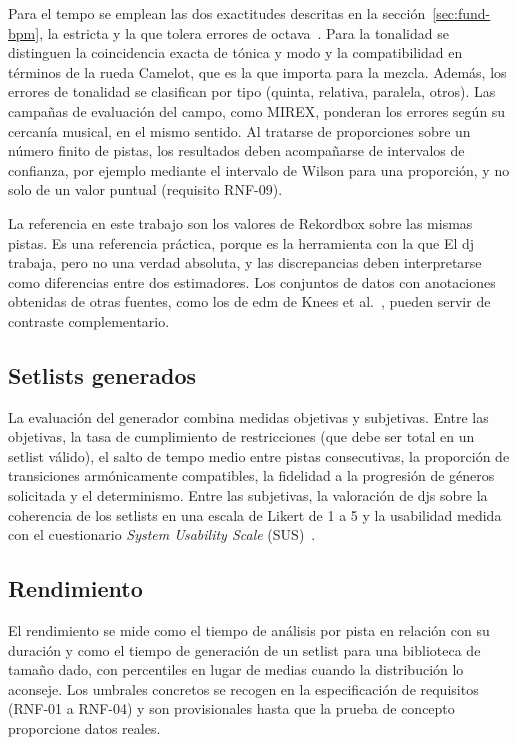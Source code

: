 Para el tempo se emplean las dos exactitudes descritas en la sección~\ref{sec:fund-bpm}, la estricta y la que tolera errores de octava~\cite{gouyon2006experimental}. Para la tonalidad se distinguen la coincidencia exacta de tónica y modo y la compatibilidad en términos de la rueda Camelot, que es la que importa para la mezcla. Además, los errores de tonalidad se clasifican por tipo (quinta, relativa, paralela, otros). Las campañas de evaluación del campo, como MIREX, ponderan los errores según su cercanía musical, en el mismo sentido. Al tratarse de proporciones sobre un número finito de pistas, los resultados deben acompañarse de intervalos de confianza, por ejemplo mediante el intervalo de Wilson para una proporción, y no solo de un valor puntual (requisito RNF-09).

La referencia en este trabajo son los valores de Rekordbox sobre las mismas pistas. Es una referencia práctica, porque es la herramienta con la que El \acs{dj} trabaja, pero no una verdad absoluta, y las discrepancias deben interpretarse como diferencias entre dos estimadores. Los conjuntos de datos con anotaciones obtenidas de otras fuentes, como los de \acs{edm} de Knees et al.~\cite{knees2015giantsteps}, pueden servir de contraste complementario.

\subsection{Setlists generados}

La evaluación del generador combina medidas objetivas y subjetivas. Entre las objetivas, la tasa de cumplimiento de restricciones (que debe ser total en un setlist válido), el salto de tempo medio entre pistas consecutivas, la proporción de transiciones armónicamente compatibles, la fidelidad a la progresión de géneros solicitada y el determinismo. Entre las subjetivas, la valoración de \acsp{dj} sobre la coherencia de los setlists en una escala de Likert de 1 a 5 y la usabilidad medida con el cuestionario \emph{System Usability Scale} (SUS)~\cite{brooke1996sus}.

\subsection{Rendimiento}

El rendimiento se mide como el tiempo de análisis por pista en relación con su duración y como el tiempo de generación de un setlist para una biblioteca de tamaño dado, con percentiles en lugar de medias cuando la distribución lo aconseje. Los umbrales concretos se recogen en la especificación de requisitos (RNF-01 a RNF-04) y son provisionales hasta que la prueba de concepto proporcione datos reales.








